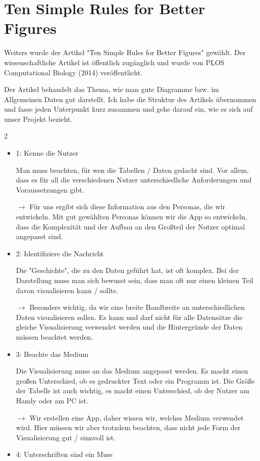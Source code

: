 \section{Ten Simple Rules for Better Figures}
Weiters wurde der Artikel "Ten Simple Rules for Better Figures"\cite{simple_rules} gewählt. Der wissenschaftliche Artikel ist öffentlich zugänglich und wurde von PLOS Computational Biology (2014) veröffentlicht.

\smallskip
\noindent
Der Artikel behandelt das Thema, wie man gute Diagramme bzw. im Allgemeinen Daten gut darstellt. Ich habe die Struktur des Artikels übernommen und fasse jeden Unterpunkt kurz zusammen und gehe darauf ein, wie es sich auf unser Projekt bezieht.

\begin{paracol}{2}
%
\smallskip
\begin{itemize}
    \item 1: Kenne die Nutzer
    
    Man muss beachten, für wen die Tabellen / Daten gedacht sind. Vor allem, dass es für all die verschiedenen Nutzer unterschiedliche Anforderungen und Voraussetzungen gibt.

    $\rightarrow$ Für uns ergibt sich diese Information aus den Personas, die wir entwickeln. Mit gut gewählten Personas können wir die App so entwickeln, dass die Komplexität und der Aufbau an den Großteil der Nutzer optimal angepasst sind.
    \item 2: Identifiziere die Nachricht
    
    Die "Geschichte", die zu den Daten geführt hat, ist oft komplex. Bei der Darstellung muss man sich bewusst sein, dass man oft nur einen kleinen Teil davon visualisieren kann / sollte.

    $\rightarrow$ Besonders wichtig, da wir eine breite Bandbreite an unterschiedlichen Daten visualisieren sollen. Es kann und darf nicht für alle Datensätze die gleiche Visualisierung verwendet werden und die Hintergründe der Daten müssen beachtet werden.
    \item 3: Beachte das Medium
    
    Die Visualisierung muss an das Medium angepasst werden. Es macht einen großen Unterschied, ob es gedruckter Text oder ein Programm ist. Die Größe der Tabelle ist auch wichtig, es macht einen Unterschied, ob der Nutzer am Handy oder am PC ist.

    $\rightarrow$ Wir erstellen eine App, daher wissen wir, welches Medium verwendet wird. Hier müssen wir aber trotzdem beachten, dass nicht jede Form der Visualisierung gut / sinnvoll ist.
    \item 4: Unterschriften sind ein Muss
    

\end{itemize}
\end{paracol}
